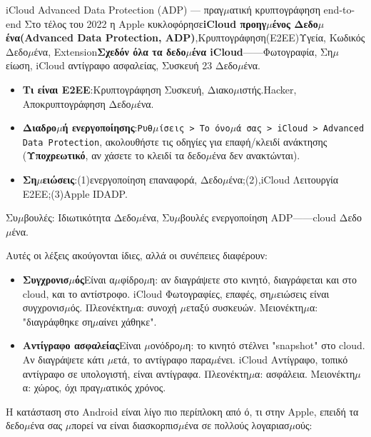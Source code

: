 \begin{tcbwarn}{iCloud Advanced Data Protection (ADP) — πραγ$\mu$ατική κρυπτογράφηση end-to-end}
Στο τέλος του 2022 η Apple κυκλοφόρησε\textbf{iCloud προηγ$\mu$ένος Δεδο$\mu$ένα(Advanced Data Protection, ADP)},Κρυπτογράφηση(E2EE)Υγεία, Κωδικός Δεδο$\mu$ένα, Extension\textbf{Σχεδόν όλα τα δεδο$\mu$ένα iCloud}——Φωτογραφία, Ση$\mu$είωση, iCloud αντίγραφο ασφαλείας, Συσκευή 23 Δεδο$\mu$ένα.

\begin{itemize}
  \item \textbf{Τι είναι E2EE}:Κρυπτογράφηση Συσκευή, Διακο$\mu$ιστής.Hacker, Αποκρυπτογράφηση Δεδο$\mu$ένα.
  \item \textbf{Διαδρο$\mu$ή ενεργοποίησης}:\texttt{Ρυθ$\mu$ίσεις > Το όνο$\mu$ά σας > iCloud > Advanced Data Protection}, ακολουθήστε τις οδηγίες για επαφή/κλειδί ανάκτησης (\textbf{Υποχρεωτικό}, αν χάσετε το κλειδί τα δεδο$\mu$ένα δεν ανακτώνται).
  \item \textbf{Ση$\mu$ειώσεις}:(1)ενεργοποίηση επαναφορά, Δεδο$\mu$ένα;(2),iCloud Λειτουργία E2EE;(3)Apple IDADP.
\end{itemize}

Συ$\mu$βουλές: Ιδιωτικότητα Δεδο$\mu$ένα, Συ$\mu$βουλές ενεργοποίηση ADP——cloud Δεδο$\mu$ένα.

\end{tcbwarn}


Αυτές οι λέξεις ακούγονται ίδιες, αλλά οι συνέπειες διαφέρουν:

\begin{itemize}
  \item \textbf{Συγχρονισ$\mu$ός}Είναι α$\mu$φίδρο$\mu$η: αν διαγράψετε στο κινητό, διαγράφεται και στο cloud, και το αντίστροφο. iCloud Φωτογραφίες, επαφές, ση$\mu$ειώσεις είναι συγχρονισ$\mu$ός. Πλεονέκτη$\mu$α: συνοχή $\mu$εταξύ συσκευών. Μειονέκτη$\mu$α: "διαγράφθηκε ση$\mu$αίνει χάθηκε".
  \item \textbf{Αντίγραφο ασφαλείας}Είναι $\mu$ονόδρο$\mu$η: το κινητό στέλνει "snapshot" στο cloud. Αν διαγράψετε κάτι $\mu$ετά, το αντίγραφο παρα$\mu$ένει. iCloud Αντίγραφο, τοπικό αντίγραφο σε υπολογιστή, είναι αντίγραφα. Πλεονέκτη$\mu$α: ασφάλεια. Μειονέκτη$\mu$α: χώρος, όχι πραγ$\mu$ατικός χρόνος.
\end{itemize}


Η κατάσταση στο Android είναι λίγο πιο περίπλοκη από ό, τι στην Apple, επειδή τα δεδο$\mu$ένα σας $\mu$πορεί να είναι διασκορπισ$\mu$ένα σε πολλούς λογαριασ$\mu$ούς:


